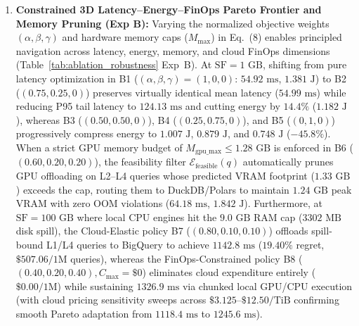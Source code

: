 \documentclass[10pt,a4paper]{article}
\begin{document}
\begin{enumerate}[leftmargin=1.5em,itemsep=0.8pt]
mathematically, $\text{CSCI}(q)$ is an exact deterministic linear combination of the six atomic operator counts $[D,J,S,W,U,C]$ (yielding $R^2=1.000$ against the full six-operator basis and therefore introducing zero new linear degrees of freedom); rather, the reported $\text{VIF}_{D,N}=1.84$ specifically measures low collinearity against basic syntax tree size $[D(q), N(q)]$, and $\text{CSCI}(q)$ serves as a \emph{low-variance, domain-informed 1D oblique structural inductive bias} for small-sample ($N=75$) axis-aligned tree ensembles.
    \item \textbf{Constrained 3D Latency--Energy--FinOps Pareto Frontier and Memory Pruning (Exp B):} Varying the normalized objective weights $(\alpha, \beta, \gamma)$ and hardware memory caps ($M_{\max}$) in Eq.~(8) enables principled navigation across latency, energy, memory, and cloud FinOps dimensions (Table~\ref{tab:ablation_robustness} Exp~B). At $\text{SF}=1\text{ GB}$, shifting from pure latency optimization in B1 ($(\alpha,\beta,\gamma)=(1,0,0)$: $54.92\text{ ms}$, $1.381\text{ J}$) to B2 ($(0.75, 0.25, 0)$) preserves virtually identical mean latency ($54.99\text{ ms}$) while reducing P95 tail latency to $124.13\text{ ms}$ and cutting energy by $14.4\%$ ($1.182\text{ J}$), whereas B3 ($(0.50, 0.50, 0)$), B4 ($(0.25, 0.75, 0)$), and B5 ($(0, 1, 0)$) progressively compress energy to $1.007\text{ J}$, $0.879\text{ J}$, and $0.748\text{ J}$ ($-45.8\%$). When a strict GPU memory budget of $M_{\text{gpu\_max}} \le 1.28\text{ GB}$ is enforced in B6 ($(0.60, 0.20, 0.20)$), the feasibility filter $\mathcal{E}_{\text{feasible}}(q)$ automatically prunes GPU offloading on L2--L4 queries whose predicted VRAM footprint ($1.33\text{ GB}$) exceeds the cap, routing them to DuckDB/Polars to maintain $1.24\text{ GB}$ peak VRAM with zero OOM violations ($64.18\text{ ms}$, $1.842\text{ J}$). Furthermore, at $\text{SF}=100\text{ GB}$ where local CPU engines hit the $9.0\text{ GB}$ RAM cap ($3302\text{ MB}$ disk spill), the Cloud-Elastic policy B7 ($(0.80, 0.10, 0.10)$) offloads spill-bound L1/L4 queries to BigQuery to achieve $1142.8\text{ ms}$ ($19.40\%$ regret, $\$507.06/1\text{M}$ queries), whereas the FinOps-Constrained policy B8 ($(0.40, 0.20, 0.40), C_{\max}=\$0$) eliminates cloud expenditure entirely ($\$0.00/1\text{M}$) while sustaining $1326.9\text{ ms}$ via chunked local GPU/CPU execution (with cloud pricing sensitivity sweeps across $\$3.125\text{--}\$12.50\text{/TiB}$ confirming smooth Pareto adaptation from $1118.4\text{ ms}$ to $1245.6\text{ ms}$). 

\end{enumerate}
\end{document}
